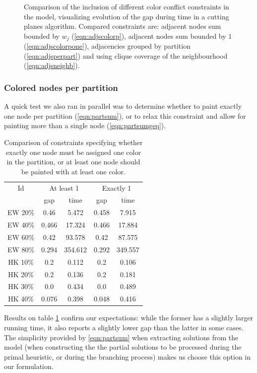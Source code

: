 \begin{figure}
\caption{Comparison of the inclusion of different color conflict constraints in the model, visualizing evolution of the gap during time in a cutting planes algorithm. Compared constraints are: adjacent nodes sum bounded by $w_j$ (\ref{eqn:adjscolorp}), adjacent nodes sum bounded by $1$ (\ref{eqn:adjscolorpone}), adjacencies grouped by partition (\ref{eqn:adjsperpart}) and using clique coverage of the neighbourhood (\ref{eqn:adjsneighb}).}
\label{fig:models:adj}
\end{figure}

\subsubsection{Colored nodes per partition}

A quick test we also ran in parallel was to determine whether to paint exactly one node per partition (\ref{eqn:partsum}), or to relax this constraint and allow for painting more than a single node (\ref{eqn:partsumgeq}). 

\begin{table}
\centering

\begin{tabular}{|c|cc|cc|}
\hline
\multicolumn{1}{|c|}{Id} & \multicolumn{2}{|c|}{At least 1} & \multicolumn{2}{|c|}{Exactly 1}
\\
 & gap & time & gap & time
\\
\hline
EW 20\% & 0.46 & 5.472 & 0.458 & 7.915
\\
EW 40\% & 0.466 & 17.324 & 0.466 & 17.884
\\
EW 60\% & 0.42 & 93.578 & 0.42 & 87.575
\\
EW 80\% & 0.294 & 354.612 & 0.292 & 349.557
\\
\hline
HK 10\% &  0.2 & 0.112 &  0.2 & 0.106
\\
HK 20\% &  0.2 & 0.136 &  0.2 & 0.181
\\
HK 30\% &  0.0 & 0.434 &  0.0 & 0.489
\\
HK 40\% & 0.076 & 0.398 & 0.048 & 0.416
\\
\hline 
 \end{tabular}

\caption{Comparison of constraints specifying whether exactly one node must be assigned one color in the partition, or at least one node should be painted with at least one color.}
\label{table:models:partsum}
\end{table}

Results on table \ref{table:models:partsum} confirm our expectations: while the former has a slightly larger running time, it also reports a slightly lower gap than the latter in some cases. The simplicity provided by \ref{eqn:partsum} when extracting solutions from the model (when constructing the the partial solutions to be processed during the primal heuristic, or during the branching process) makes us choose this option in our formulation.

